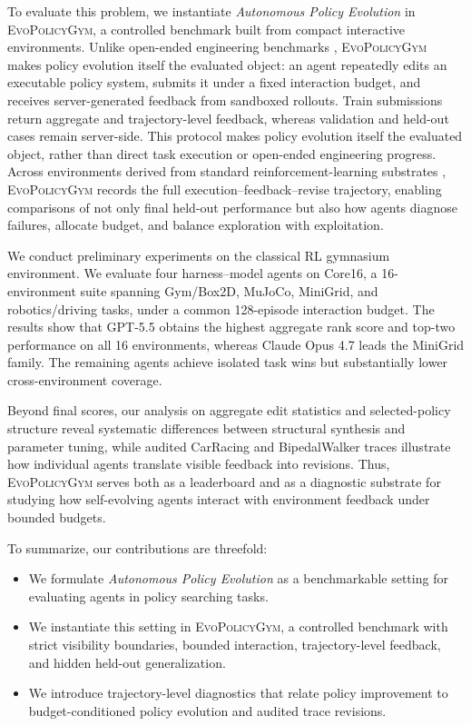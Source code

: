 To evaluate this problem, we instantiate \emph{Autonomous Policy Evolution} in \textsc{EvoPolicyGym}, a controlled benchmark built from compact interactive environments. 
Unlike open-ended engineering benchmarks \citep{frontiereng}, 
\textsc{EvoPolicyGym} makes policy evolution itself the evaluated object: an agent repeatedly edits an executable policy system, submits it under a fixed interaction budget, and receives server-generated feedback from sandboxed rollouts. 
Train submissions return aggregate and trajectory-level feedback, whereas validation and held-out cases remain server-side.
This protocol makes policy evolution itself the evaluated object, rather than direct task execution or open-ended engineering progress. Across environments derived from standard reinforcement-learning substrates \citep{mujoco,minigrid,gymnasium}, \textsc{EvoPolicyGym} records the full execution--feedback--revise trajectory, enabling comparisons of not only final held-out performance but also how agents diagnose failures, allocate budget, and balance exploration with exploitation.


We conduct preliminary experiments on the classical RL gymnasium environment.
We evaluate four harness--model agents on Core16, a 16-environment suite spanning Gym/Box2D, MuJoCo, MiniGrid, and robotics/driving tasks, under a common 128-episode interaction budget. The results show that GPT-5.5 obtains the highest aggregate rank score and top-two performance on all 16 environments, whereas Claude Opus 4.7 leads the MiniGrid family. The remaining agents achieve isolated task wins but substantially lower cross-environment coverage.

Beyond final scores, our analysis on aggregate edit statistics and selected-policy structure reveal systematic differences between structural synthesis and parameter tuning, while audited CarRacing and BipedalWalker traces illustrate how individual agents translate visible feedback into revisions.
Thus, \textsc{EvoPolicyGym} serves both as a leaderboard and as a diagnostic substrate for studying how self-evolving agents interact with environment feedback under bounded budgets.

To summarize, our contributions are threefold:
\begin{itemize}
    \item We formulate \emph{Autonomous Policy Evolution} as a benchmarkable setting for evaluating agents in policy searching tasks.
    \item We instantiate this setting in \textsc{EvoPolicyGym}, a controlled benchmark with strict visibility boundaries, bounded interaction, trajectory-level feedback, and hidden held-out generalization. 
    \item We introduce trajectory-level diagnostics that relate policy improvement to budget-conditioned policy evolution and audited trace revisions.
\end{itemize}

